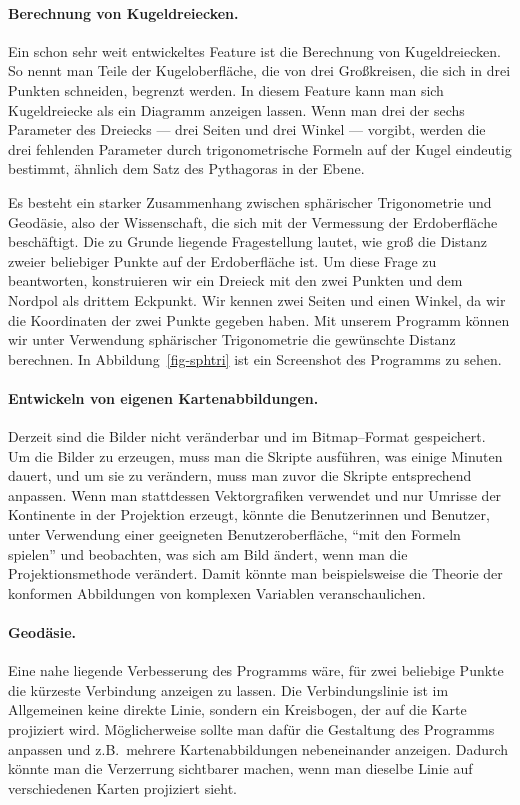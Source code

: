 \documentclass[a4paper,12pt]{article}
\begin{document}
\paragraph{Berechnung von Kugeldreiecken.} 
Ein schon sehr weit entwickeltes Feature ist die Berechnung von Kugeldreiecken.
So nennt man Teile der Kugeloberfläche, die von drei Großkreisen, die sich in drei
Punkten schneiden, begrenzt werden. In diesem Feature kann man sich Kugeldreiecke 
als ein Diagramm anzeigen lassen. Wenn man drei der sechs Parameter des Dreiecks ---
drei Seiten und drei Winkel --- vorgibt, werden die drei fehlenden Parameter durch
trigonometrische Formeln auf der Kugel eindeutig bestimmt, ähnlich dem Satz des 
Pythagoras in der Ebene. 

Es besteht ein starker Zusammenhang zwischen sphärischer Trigonometrie und Geodäsie,
also der Wissenschaft, die sich mit der Vermessung der Erdoberfläche beschäftigt.
Die zu Grunde liegende Fragestellung lautet, wie groß die Distanz zweier beliebiger
Punkte auf der Erdoberfläche ist. Um diese Frage zu beantworten, konstruieren wir 
ein Dreieck mit den zwei Punkten und dem Nordpol als drittem Eckpunkt. Wir kennen 
zwei Seiten und einen Winkel, da wir die Koordinaten der zwei Punkte gegeben haben.
Mit unserem Programm können wir unter Verwendung sphärischer Trigonometrie die 
gewünschte Distanz berechnen. In Abbildung~\ref{fig-sphtri} ist ein Screenshot
des Programms zu sehen.

\paragraph{Entwickeln von eigenen Kartenabbildungen.} 
Derzeit sind die Bilder nicht veränderbar und im Bitmap--Format gespeichert.
Um die Bilder zu erzeugen, muss man die Skripte ausführen, was einige Minuten 
dauert, und um sie zu verändern, muss man zuvor die Skripte entsprechend anpassen.
Wenn man stattdessen Vektorgrafiken verwendet und nur Umrisse der Kontinente in der 
Projektion erzeugt, könnte die Benutzerinnen und Benutzer, unter Verwendung einer 
geeigneten Benutzeroberfläche, "`mit den Formeln spielen"' und beobachten, was sich 
am Bild ändert, wenn man die Projektionsmethode verändert. Damit könnte man 
beispielsweise die Theorie der konformen Abbildungen von komplexen Variablen 
veranschaulichen.

\paragraph{Geodäsie.} 
Eine nahe liegende Verbesserung des Programms wäre, für zwei beliebige Punkte
die kürzeste Verbindung anzeigen zu lassen. Die Verbindungslinie ist im Allgemeinen 
keine direkte Linie, sondern ein Kreisbogen, der auf die Karte projiziert wird.
Möglicherweise sollte man dafür die Gestaltung des Programms anpassen und z.B.\ 
mehrere Kartenabbildungen nebeneinander anzeigen. Dadurch könnte man die Verzerrung 
sichtbarer machen, wenn man dieselbe Linie auf verschiedenen Karten projiziert sieht.
\end{document}

